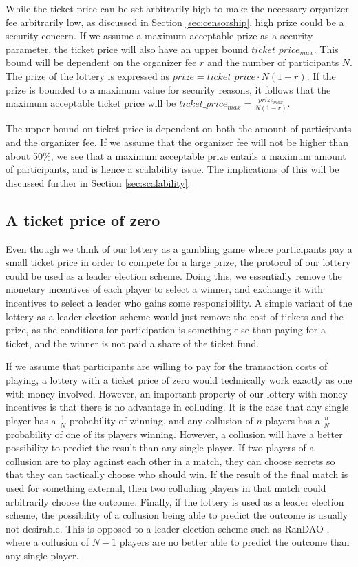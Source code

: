 While the ticket price can be set arbitrarily high to make the necessary organizer fee arbitrarily low, as discussed in Section \ref{sec:censorship}, high prize could be a security concern. If we assume a maximum acceptable prize as a security parameter, the ticket price will also have an upper bound $ticket\_price_{max}$. This bound will be dependent on the organizer fee $r$ and the number of participants $N$. The prize of the lottery is expressed as $prize=ticket\_price \cdot N(1-r)$. If the prize is bounded to a maximum value for security reasons, it follows that the maximum acceptable ticket price will be $ticket\_price_{max}=\frac{prize_{max}}{N(1-r)}$. 

The upper bound on ticket price is dependent on both the amount of participants and the organizer fee. If we assume that the organizer fee will not be higher than about 50\%, we see that a maximum acceptable prize entails a maximum amount of participants, and is hence a scalability issue. The implications of this will be discussed further in Section \ref{sec:scalability}.

\subsection{A ticket price of zero}
Even though we think of our lottery as a gambling game where participants pay a small ticket price in order to compete for a large prize, the protocol of our lottery could be used as a leader election scheme. Doing this, we essentially remove the monetary incentives of each player to select a winner, and exchange it with incentives to select a leader who gains some responsibility. A simple variant of the lottery as a leader election scheme would just remove the cost of tickets and the prize, as the conditions for participation is something else than paying for a ticket, and the winner is not paid a share of the ticket fund.

If we assume that participants are willing to pay for the transaction costs of playing, a lottery with a ticket price of zero would technically work exactly as one with money involved. However, an important property of our lottery with money incentives is that there is no advantage in colluding. It is the case that any single player has a $\frac{1}{N}$ probability of winning, and any collusion of $n$ players has a $\frac{n}{N}$ probability of one of its players winning. However, a collusion will have a better possibility to predict the result than any single player. If two players of a collusion are to play against each other in a match, they can choose secrets so that they can tactically choose who should win. If the result of the final match is used for something external, then two colluding players in that match could arbitrarily choose the outcome. Finally, if the lottery is used as a leader election scheme, the possibility of a collusion being able to predict the outcome is usually not desirable. This is opposed to a leader election scheme such as RanDAO \cite{randao2015randao}, where a collusion of $N-1$ players are no better able to predict the outcome than any single player.

